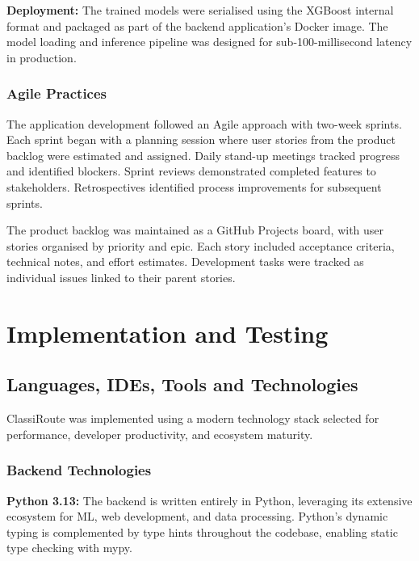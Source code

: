\documentclass[oneside,12pt,a4paper]{report}
\begin{document}
\textbf{Deployment:} The trained models were serialised using the XGBoost internal format and packaged as part of the backend application's Docker image. The model loading and inference pipeline was designed for sub-100-millisecond latency in production.

\subsection{Agile Practices}

The application development followed an Agile approach with two-week sprints. Each sprint began with a planning session where user stories from the product backlog were estimated and assigned. Daily stand-up meetings tracked progress and identified blockers. Sprint reviews demonstrated completed features to stakeholders. Retrospectives identified process improvements for subsequent sprints.

The product backlog was maintained as a GitHub Projects board, with user stories organised by priority and epic. Each story included acceptance criteria, technical notes, and effort estimates. Development tasks were tracked as individual issues linked to their parent stories.

\chapter{Implementation and Testing}

\section{Languages, IDEs, Tools and Technologies}

ClassiRoute was implemented using a modern technology stack selected for performance, developer productivity, and ecosystem maturity.

\subsection{Backend Technologies}

\textbf{Python 3.13:} The backend is written entirely in Python, leveraging its extensive ecosystem for ML, web development, and data processing. Python's dynamic typing is complemented by type hints throughout the codebase, enabling static type checking with mypy.
\end{document}
